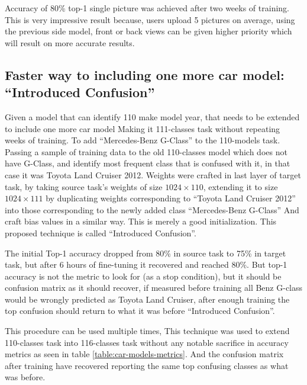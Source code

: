 Accuracy of 80\% top-1 single picture was achieved after two weeks of training. This is very impressive result because,
users upload 5 pictures on average, using the previous side model, front or back views can be given higher priority
which will result on more accurate results.

\subsection{Faster way to including one more car model: ``Introduced Confusion''}

Given a model that can identify 110 make model year, that needs to be extended to include one more car model
Making it 111-classes task without repeating weeks of training.
To add ``Mercedes-Benz G-Class'' to the 110-models task.
Passing a sample of training data to the old 110-classes model which does not have G-Class, 
and identify most frequent class that is confused with it, in that case it was Toyota Land Cruiser 2012.
Weights were crafted in last layer of target task, by taking source task's weights 
of size \(1024\times110\), extending it to size \(1024\times111\)
by duplicating weights corresponding to ``Toyota Land Cruiser 2012''
into those corresponding to the newly added class ``Mercedes-Benz G-Class''
And craft bias values in a similar way. This is merely a good initialization.
This proposed technique is called ``Introduced Confusion''.

The initial Top-1 accuracy dropped from 80\% in source task to 75\% in target task,
but after 6 hours of fine-tuning it recovered and reached 80\%.
But top-1 accuracy is not the metric to look for (as a stop condition),
but it should be confusion matrix as it should recover, if measured before training
all Benz G-class would be wrongly predicted as Toyota Land Cruiser, after enough training
the top confusion should return to what it was before ``Introduced Confusion''.

This procedure can be used multiple times,
This technique was used to extend 110-classes task into 116-classes task
without any notable sacrifice in accuracy metrics as seen in table \ref{table:car-models-metrics}.
And the confusion matrix after training have recovered reporting the same top confusing classes as what was before.


